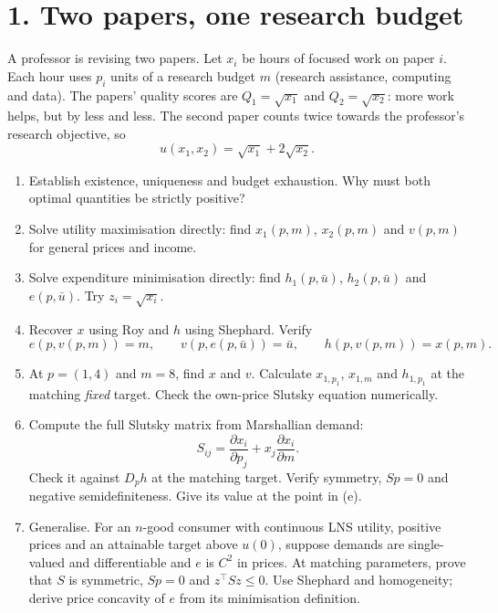 \section*{1. Two papers, one research budget}
A professor is revising two papers. Let $x_i$ be hours of focused work on
paper $i$. Each hour uses $p_i$ units of a research budget $m$ (research
assistance, computing and data). The papers' quality scores are
$Q_1=\sqrt{x_1}$ and $Q_2=\sqrt{x_2}$: more work helps, but by less and
less. The second paper counts twice towards the professor's research
objective, so
\[
 u(x_1,x_2)=\sqrt{x_1}+2\sqrt{x_2}.
\]
\begin{enumerate}[label=(\alph*)]
\item Establish existence, uniqueness and budget exhaustion. Why must both
optimal quantities be strictly positive?
\item Solve utility maximisation directly: find $x_1(p,m)$, $x_2(p,m)$ and
$v(p,m)$ for general prices and income.
\item Solve expenditure minimisation directly: find $h_1(p,\bar u)$,
$h_2(p,\bar u)$ and $e(p,\bar u)$. Try $z_i=\sqrt{x_i}$.
\item Recover $x$ using Roy and $h$ using Shephard. Verify
\[
 e(p,v(p,m))=m,\qquad v(p,e(p,\bar u))=\bar u,
 \qquad h(p,v(p,m))=x(p,m).
\]
\item At $p=(1,4)$ and $m=8$, find $x$ and $v$. Calculate
$x_{1,p_1}$, $x_{1,m}$ and $h_{1,p_1}$ at the matching \emph{fixed} target.
Check the own-price Slutsky equation numerically.
\item Compute the full Slutsky matrix from Marshallian demand:
\[
 S_{ij}=\frac{\partial x_i}{\partial p_j}
       +x_j\frac{\partial x_i}{\partial m}.
\]
Check it against $D_ph$ at the matching target. Verify symmetry,
$Sp=0$ and negative semidefiniteness. Give its value at the point in (e).
\item Generalise. For an $n$-good consumer with continuous LNS utility,
positive prices and an attainable target above $u(0)$, suppose demands are
single-valued and differentiable and $e$ is $C^2$ in prices. At matching
parameters, prove that $S$ is symmetric, $Sp=0$ and $z^\top Sz\le0$.
Use Shephard and homogeneity; derive price concavity of $e$ from its
minimisation definition.
\end{enumerate}

\clearpage
